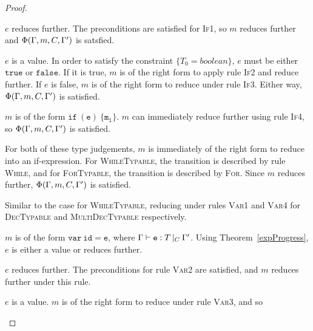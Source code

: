 \documentclass[a4paper]{article}
\theoremstyle{definition}
\theoremstyle{dotless}
\begin{document}
\begin{proof}
\begin{case}[IfTypable]
	\begin{subcase}
	  $e$ reduces further. 
	  The preconditions are satisfied for \textsc{If1}, so $m$ reduces
	  further and $\Phi(\Gamma, m, C, \Gamma')$ is satsfied.
	\end{subcase}

	\begin{subcase}
	  $e$ is a value.
	  In order to satisfy the constraint $\{T_0 = boolean\}$, $e$ must be either
	  $\mathtt{true}$ or $\mathtt{false}$. If it is true, $m$ is of the right
	  form to apply rule \textsc{If2} and reduce further. If $e$ is false, $m$
	  is of the right form to reduce under rule \textsc{If3}. Either way,
	  $\Phi(\Gamma, m, C, \Gamma')$ is satisfied.
	\end{subcase}

  \end{case}

  \begin{case}[IfTypable2]\label{iftypable2}

	$m$ is of the form $\mathtt{if\ (e)\ \{m_1\}}$. $m$ can immediately reduce
	further using rule \textsc{If4}, so $\Phi(\Gamma, m, C, \Gamma')$ is satisfied.

  \end{case}

  \begin{case}\label{looptypable}

  	For both of these type judgements, $m$ is immediately of the right form to
  	reduce into an if-expression. For \textsc{WhileTypable}, the transition is
  	described by rule \textsc{While}, and for \textsc{ForTypable}, the
  	transition is described by \textsc{For}. Since $m$ reduces further,
  	$\Phi(\Gamma, m, C, \Gamma')$ is satisfied.

  \end{case}

  \begin{case}\label{dectypable}

	Similar to the case for \textsc{WhileTypable}, reducing under rules
	\textsc{Var1} and \textsc{Var4} for \textsc{DecTypable} and
	\textsc{MultiDecTypable} respectively.

  \end{case}


  \begin{case}[DefTypable]\label{deftypable}

	$m$ is of the form $\mathtt{var\ id=e}$, where $\Gamma{}\vdash\mathtt{e}: T\,|_C\:\Gamma'$. Using
	Theorem~\ref{expProgress}, $e$ is either a value or reduces further. 

	\begin{subcase}
	  $e$ reduces further.
	  The preconditions for rule \textsc{Var2} are satisfied, and $m$ reduces
	  further under this rule.
	\end{subcase}

	\begin{subcase}
	  $e$ is a value. 
	  $m$ is of the right form to reduce under rule \textsc{Var3}, and so
	\end{subcase}

  \end{case}

\end{proof}
\end{document}
